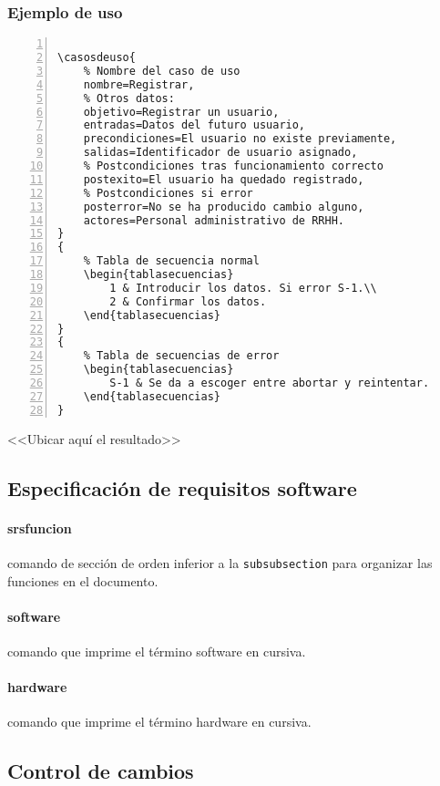 \documentclass[draft]{ltxdoc}
\begin{document}
\subsubsection{Ejemplo de uso}
\begin{Verbatim}[numbers=left, label=Ejemplo]
% Ejemplo de caso de uso.
		
\casosdeuso{
	% Nombre del caso de uso
	nombre=Registrar,
	% Otros datos:
	objetivo=Registrar un usuario,
	entradas=Datos del futuro usuario,
	precondiciones=El usuario no existe previamente,
	salidas=Identificador de usuario asignado,
	% Postcondiciones tras funcionamiento correcto
	postexito=El usuario ha quedado registrado,
	% Postcondiciones si error
	posterror=No se ha producido cambio alguno,
	actores=Personal administrativo de RRHH.
}
{
	% Tabla de secuencia normal
	\begin{tablasecuencias}
		1 & Introducir los datos. Si error S-1.\\
		2 & Confirmar los datos.
	\end{tablasecuencias}
}
{
	% Tabla de secuencias de error
	\begin{tablasecuencias}
		S-1 & Se da a escoger entre abortar y reintentar.
	\end{tablasecuencias}
}
\end{Verbatim}

<<Ubicar aquí el resultado>>

\subsection{Especificación de requisitos software}
	\paragraph{srsfuncion}comando de sección de orden inferior a la \verb|subsubsection| para organizar las funciones en el documento.
	\paragraph{software}comando que imprime el término software en cursiva.
	\paragraph{hardware}comando que imprime el término hardware en cursiva.

\subsection{Control de cambios}
\end{document}

